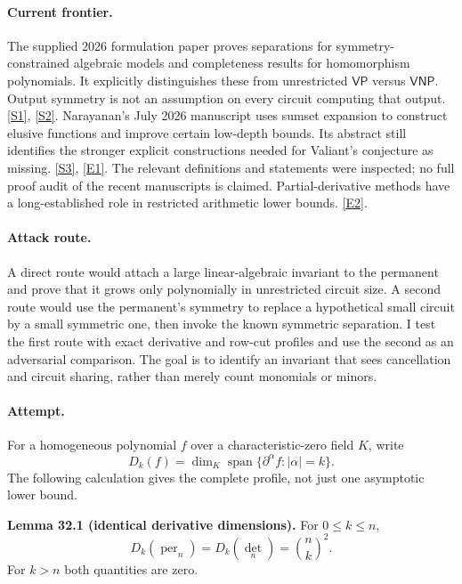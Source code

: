 \documentclass[11pt,a4paper]{article}
\newcommand{\sref}[2]{\hyperlink{source:#1:#2}{[S#2]}}
\newcommand{\eref}[2]{\hyperlink{extra:#1:#2}{[E#2]}}
\numberwithin{equation}{section}
\begin{document}
\paragraph{Current frontier.}
The supplied 2026 formulation paper proves separations for symmetry-constrained
algebraic models and completeness results for homomorphism polynomials. It
explicitly distinguishes these from unrestricted $\mathsf{VP}$ versus
$\mathsf{VNP}$. Output symmetry is not an assumption on every circuit
computing that output. \sref{30001375}{1}, \sref{30001375}{2}.
Narayanan's July 2026 manuscript uses sumset expansion to construct elusive
functions and improve certain low-depth bounds. Its abstract still identifies
the stronger explicit constructions needed for Valiant's conjecture as
missing. \sref{30001375}{3}, \eref{30001375}{1}. The relevant definitions and statements
were inspected; no full proof audit of the recent manuscripts is claimed.
Partial-derivative methods have a long-established role in restricted
arithmetic lower bounds. \eref{30001375}{2}.

\paragraph{Attack route.}
A direct route would attach a large linear-algebraic invariant to the
permanent and prove that it grows only polynomially in unrestricted circuit
size. A second route would use the permanent's symmetry to replace a
hypothetical small circuit by a small symmetric one, then invoke the known
symmetric separation. I test the first route with exact derivative and
row-cut profiles and use the second as an adversarial comparison. The goal
is to identify an invariant that sees cancellation and circuit sharing,
rather than merely count monomials or minors.

\paragraph{Attempt.}
For a homogeneous polynomial $f$ over a characteristic-zero field $K$, write
\[
 D_k(f)=\dim_K\operatorname{span}\{\partial^\alpha f:|\alpha|=k\}.
\]
The following calculation gives the complete profile, not just one
asymptotic lower bound.

\textbf{Lemma 32.1 (identical derivative dimensions).}
For $0\le k\le n$,
\begin{equation}\label{r32:derivatives}
 D_k(\operatorname{per}_n)=D_k(\det_n)=\binom nk^2.
\end{equation}
For $k>n$ both quantities are zero.
\end{document}
